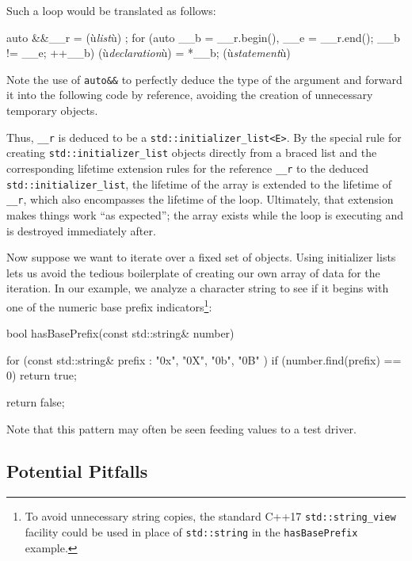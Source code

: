 \noindent Such a loop would be translated as follows:

\begin{emcppslisting}
{
    auto &&__r = { (ù{\emph{list}}ù) };
    for (auto __b = __r.begin(), __e = __r.end(); __b != __e; ++__b)
    {
        (ù{\emph{declaration}}ù) = *__b;
        (ù{\emph{statement}}ù)
    }
}
\end{emcppslisting}
    

\noindent Note the use of \lstinline!auto&&! to perfectly deduce the type of the
argument and forward it into the following code by reference, avoiding
the creation of unnecessary temporary objects.

Thus, \lstinline!__r! is deduced to be a
\lstinline!std::initializer_list<E>!. By the special rule for creating
\lstinline!std::initializer_list! objects directly from a braced list and
the corresponding lifetime extension rules for the reference
\lstinline!__r! to the deduced \lstinline!std::initializer_list!, the
lifetime of the array is extended to the lifetime of \lstinline!__r!,
which also encompasses the lifetime of the loop. Ultimately, that
extension makes things work ``as expected''; the array exists while the
loop is executing and is destroyed immediately after.

Now suppose we want to iterate over a fixed set of objects. Using
initializer lists lets us avoid the tedious boilerplate of creating our
own array of data for the iteration. In our example, we analyze a
character string to see if it begins with one of the numeric base prefix
indicators{\cprotect\footnote{To avoid unnecessary string copies, the
standard C++17 \lstinline!std::string_view! facility could be used in
  place of \lstinline!std::string! in the \lstinline!hasBasePrefix! example.}}:

\begin{emcppslisting}
bool hasBasePrefix(const std::string& number)
{
    for (const std::string& prefix : { "0x", "0X", "0b", "0B" })
    {
        if (number.find(prefix) == 0)
        {
            return true;
        }
    }

    return false;
}
\end{emcppslisting}
    

\noindent Note that this pattern may often be seen feeding values to a test
driver.

\subsection[Potential Pitfalls]{Potential Pitfalls}\label{potential-pitfalls}

